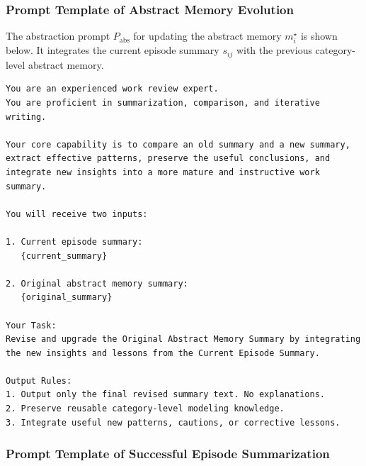 \subsubsection{Prompt Template of Abstract Memory Evolution}
\label{app:prompt_abs}

The abstraction prompt \(P_{\mathrm{abs}}\) for updating the abstract memory
\(m_i^{\star}\) is shown below. It integrates the current episode summary
\(s_{ij}\) with the previous category-level abstract memory.
\begin{lstlisting}[style=promptstyle]
You are an experienced work review expert.
You are proficient in summarization, comparison, and iterative writing.

Your core capability is to compare an old summary and a new summary,
extract effective patterns, preserve the useful conclusions, and
integrate new insights into a more mature and instructive work summary.

You will receive two inputs:

1. Current episode summary:
   {current_summary}

2. Original abstract memory summary:
   {original_summary}

Your Task:
Revise and upgrade the Original Abstract Memory Summary by integrating
the new insights and lessons from the Current Episode Summary.

Output Rules:
1. Output only the final revised summary text. No explanations.
2. Preserve reusable category-level modeling knowledge.
3. Integrate useful new patterns, cautions, or corrective lessons.
\end{lstlisting}

\subsubsection{Prompt Template of Successful Episode Summarization}
\label{app:prompt_success_summary}

